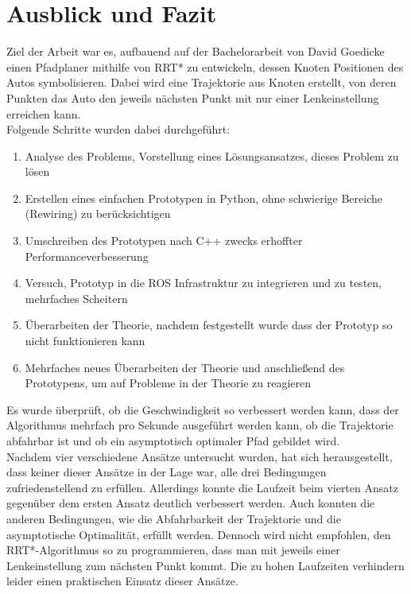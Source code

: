 \section{Ausblick und Fazit}
\label{sec:Zusammenfassung}
Ziel der Arbeit war es, aufbauend auf der Bachelorarbeit von David Goedicke \citep{Goedicke18} einen Pfadplaner mithilfe von RRT* zu entwickeln, dessen Knoten Positionen des Autos symbolisieren. Dabei wird eine Trajektorie aus Knoten erstellt, von deren Punkten das Auto den jeweils nächsten Punkt mit nur einer Lenkeinstellung erreichen kann. \\
Folgende Schritte wurden dabei durchgeführt:\\
\begin{enumerate}
\item Analyse des Problems, Vorstellung eines Lösungsansatzes, dieses Problem zu lösen
\item Erstellen eines einfachen Prototypen in Python, ohne schwierige Bereiche (Rewiring) zu berücksichtigen
\item Umschreiben des Prototypen nach C++ zwecks erhoffter Performanceverbesserung
\item Versuch, Prototyp in die ROS Infrastruktur zu integrieren und zu testen, mehrfaches Scheitern
\item Überarbeiten der Theorie, nachdem festgestellt wurde dass der Prototyp so nicht funktionieren kann
\item Mehrfaches neues Überarbeiten der Theorie und anschließend des Prototypens, um auf Probleme in der Theorie zu reagieren
\end{enumerate}
Es wurde überprüft, ob die Geschwindigkeit so verbessert werden kann, dass der Algorithmus mehrfach pro Sekunde ausgeführt werden kann, ob die Trajektorie abfahrbar ist und ob ein asymptotisch optimaler Pfad gebildet wird. \\
Nachdem vier verschiedene Ansätze untersucht wurden, hat sich herausgestellt, dass keiner dieser Ansätze in der Lage war, alle drei Bedingungen zufriedenstellend zu erfüllen. Allerdings konnte die Laufzeit beim vierten Ansatz gegenüber dem ersten Ansatz deutlich verbessert werden. Auch konnten die anderen Bedingungen, wie die Abfahrbarkeit der Trajektorie und die asymptotische Optimalität, erfüllt werden. Dennoch wird nicht empfohlen, den RRT*-Algorithmus so zu programmieren, dass man mit jeweils einer Lenkeinstellung zum nächsten Punkt kommt. Die zu hohen Laufzeiten verhindern leider einen praktischen Einsatz dieser Ansätze.



